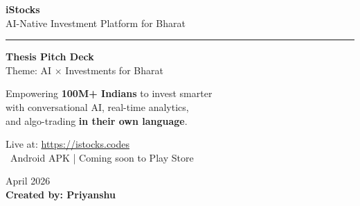 \documentclass[11pt,a4paper]{article}
\begin{document}
\begin{titlepage}
    \centering
    \vspace*{2cm}
    
    
    \vspace{1cm}
    
    {\Huge\bfseries\textcolor{primary}{iStocks}}\\[0.5cm]
    {\Large\textcolor{textgray}{AI-Native Investment Platform for Bharat}}
    
    \vspace{1.5cm}
    
    \rule{0.6\textwidth}{1pt}
    
    \vspace{1.5cm}
    
    {\large\textbf{Thesis Pitch Deck}}\\[0.3cm]
    {\normalsize Theme: AI $\times$ Investments for Bharat}
    
    \vspace{2cm}
    
    \begin{tcolorbox}[
        colback=primary!5,
        colframe=primary,
        width=0.75\textwidth,
        rounded corners,
        boxrule=1pt
    ]
    \centering
    {\normalsize Empowering \textbf{100M+ Indians} to invest smarter \\with conversational AI, real-time analytics, \\and algo-trading \textbf{in their own language}.}
    \end{tcolorbox}
    
    \vspace{2cm}
    
    {\normalsize\textcolor{textgray}{Live at: \textcolor{primary}{\url{https://istocks.codes}}}}\\[0.3cm]
    {\normalsize\textcolor{textgray}{\faAndroid~Android APK | Coming soon to Play Store}}
    
    \vfill
    
    {\small\textcolor{textgray}{April 2026}}\\[0.3cm]
    {\normalsize\textbf{Created by: Priyanshu}}
    
\end{titlepage}
\end{document}
